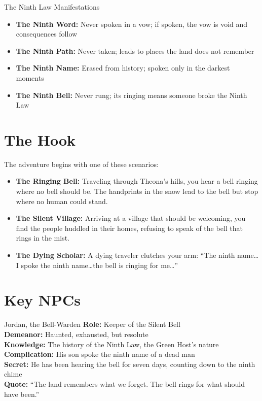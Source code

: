 \documentclass[11pt]{article}
\begin{document}
\begin{mechanicsbox}{The Ninth Law Manifestations}
\begin{itemize}
    \item \textbf{The Ninth Word:} Never spoken in a vow; if spoken, the vow is void and consequences follow
    \item \textbf{The Ninth Path:} Never taken; leads to places the land does not remember
    \item \textbf{The Ninth Name:} Erased from history; spoken only in the darkest moments
    \item \textbf{The Ninth Bell:} Never rung; its ringing means someone broke the Ninth Law
\end{itemize}
\end{mechanicsbox}

\section*{The Hook}
The adventure begins with one of these scenarios:
\begin{itemize}
    \item \textbf{The Ringing Bell:} Traveling through Theona's hills, you hear a bell ringing where no bell should be. The handprints in the snow lead to the bell but stop where no human could stand.
    \item \textbf{The Silent Village:} Arriving at a village that should be welcoming, you find the people huddled in their homes, refusing to speak of the bell that rings in the mist.
    \item \textbf{The Dying Scholar:} A dying traveler clutches your arm: ``The ninth name\dots I spoke the ninth name\dots the bell is ringing for me\dots''
\end{itemize}

\section*{Key NPCs}

\begin{npcbox}{Jordan, the Bell-Warden}
    \textbf{Role:} Keeper of the Silent Bell \\
    \textbf{Demeanor:} Haunted, exhausted, but resolute \\
    \textbf{Knowledge:} The history of the Ninth Law, the Green Host's nature \\
    \textbf{Complication:} His son spoke the ninth name of a dead man \\
    \textbf{Secret:} He has been hearing the bell for seven days, counting down to the ninth chime \\
    \textbf{Quote:} ``The land remembers what we forget. The bell rings for what should have been.''
\end{npcbox}
\end{document}
